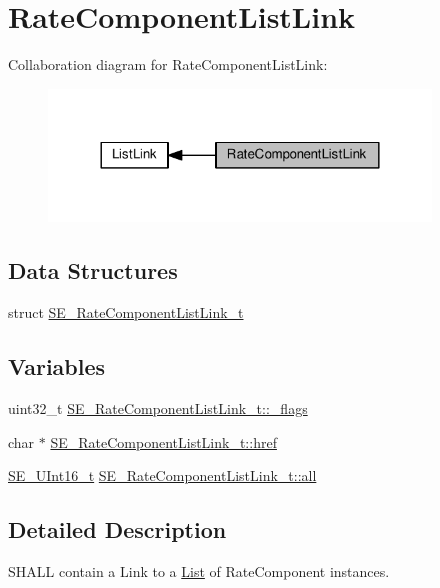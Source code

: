 \hypertarget{group__RateComponentListLink}{}\section{Rate\+Component\+List\+Link}
\label{group__RateComponentListLink}
Collaboration diagram for Rate\+Component\+List\+Link\+:\nopagebreak
\begin{figure}[H]
\begin{center}
\leavevmode
\includegraphics[width=288pt]{group__RateComponentListLink}
\end{center}
\end{figure}
\subsection*{Data Structures}
\begin{DoxyCompactItemize}
\item 
struct \hyperlink{structSE__RateComponentListLink__t}{S\+E\+\_\+\+Rate\+Component\+List\+Link\+\_\+t}
\end{DoxyCompactItemize}
\subsection*{Variables}
\begin{DoxyCompactItemize}
\item 
uint32\+\_\+t \hyperlink{group__RateComponentListLink_gab5a566e23c1feca5b7edf66e81163c59}{S\+E\+\_\+\+Rate\+Component\+List\+Link\+\_\+t\+::\+\_\+flags}
\item 
char $\ast$ \hyperlink{group__RateComponentListLink_ga30ee84ebe24949b38c65f5dba0695720}{S\+E\+\_\+\+Rate\+Component\+List\+Link\+\_\+t\+::href}
\item 
\hyperlink{group__UInt16_gac68d541f189538bfd30cfaa712d20d29}{S\+E\+\_\+\+U\+Int16\+\_\+t} \hyperlink{group__RateComponentListLink_ga2437207ebab9fb065490fd11d4f52902}{S\+E\+\_\+\+Rate\+Component\+List\+Link\+\_\+t\+::all}
\end{DoxyCompactItemize}


\subsection{Detailed Description}
S\+H\+A\+LL contain a Link to a \hyperlink{structList}{List} of Rate\+Component instances. 

